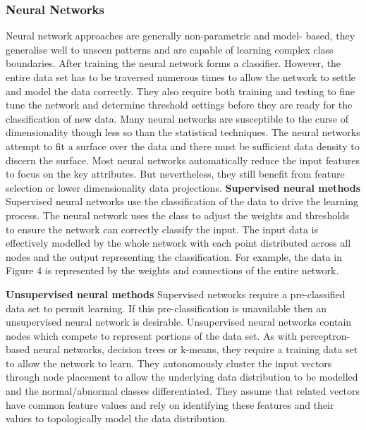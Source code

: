 \subsubsection{Neural Networks}
Neural network approaches are generally non-parametric and model- based, they generalise well to unseen patterns and are capable of learning complex class boundaries. After training the neural network forms a classifier. However, the entire data set has to be traversed numerous times to allow the network to settle and model the data correctly. They also require both training and testing to fine tune the network and determine threshold settings before they are ready for the classification of new data. Many neural networks are susceptible to the curse of dimensionality though less so than the statistical techniques. The neural networks attempt to fit a surface over the data and there must be sufficient data density to discern the surface. Most neural networks automatically reduce the input features to focus on the key attributes. But nevertheless, they still benefit from feature selection or lower dimensionality data projections. 
\textbf{Supervised neural methods}
Supervised neural networks use the classification of the data to drive the learning process. The neural network uses the class to adjust the weights and thresholds to ensure the network can correctly classify the input. The input data is effectively modelled by the whole network with each point distributed across all nodes and the output representing the classification. For example, the data in Figure 4 is represented by the weights and connections of the entire network.

\textbf{Unsupervised neural methods}
Supervised networks require a pre-classified data set to permit learning. If this pre-classification is unavailable then an unsupervised neural network is desirable. Unsupervised neural networks contain nodes which compete to represent portions of the data set. As with perceptron- based neural networks, decision trees or k-means, they require a training data set to allow the network to learn. They autonomously cluster the input vectors through node placement to allow the underlying data distribution to be modelled and the normal/abnormal classes differentiated. They assume that related vectors have common feature values and rely on identifying these features and their values to topologically model the data distribution.

